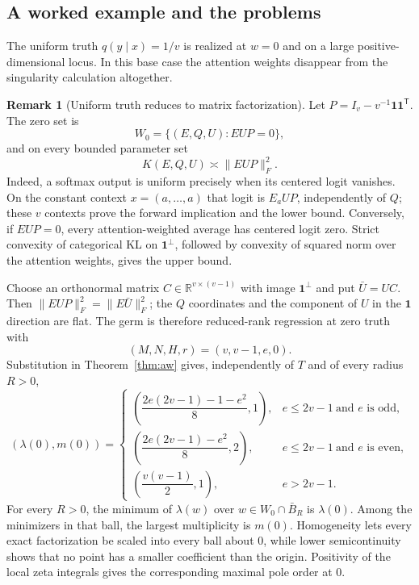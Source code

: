 \documentclass[11pt]{amsart}
\theoremstyle{plain}
\theoremstyle{definition}
\newtheorem{remark}[theorem]{Remark}
\newcommand{\R}{\mathbb{R}}
\begin{document}
\subsection{A worked example and the problems}

The uniform truth $q(y\mid x)=1/v$ is realized at $w=0$ and on a large positive-dimensional locus. In this base case the attention weights disappear from the singularity calculation altogether.

\begin{remark}[Uniform truth reduces to matrix factorization]\label{rem:attn-uniform}
Let $P=I_v-v^{-1}\mathbf1\mathbf1^{\mathsf T}$. The zero set is
\[
 W_0=\{(E,Q,U):EUP=0\},
\]
and on every bounded parameter set
\[
 K(E,Q,U)\asymp \|EUP\|_F^2.
\]
Indeed, a softmax output is uniform precisely when its centered logit vanishes. On the constant context $x=(a,\ldots,a)$ that logit is $E_aUP$, independently of $Q$; these $v$ contexts prove the forward implication and the lower bound. Conversely, if $EUP=0$, every attention-weighted average has centered logit zero. Strict convexity of categorical KL on $\mathbf1^\perp$, followed by convexity of squared norm over the attention weights, gives the upper bound.

Choose an orthonormal matrix $C\in\R^{v\times(v-1)}$ with image $\mathbf1^\perp$ and put $\bar U=UC$. Then $\|EUP\|_F^2=\|E\bar U\|_F^2$; the $Q$ coordinates and the component of $U$ in the $\mathbf1$ direction are flat. The germ is therefore reduced-rank regression at zero truth with
\[
 (M,N,H,r)=(v,v-1,e,0).
\]
Substitution in Theorem~\ref{thm:aw} gives, independently of $T$ and of every radius $R>0$,
\[
 (\lambda(0),m(0))=
 \begin{cases}
 \left(\dfrac{2e(2v-1)-1-e^2}{8},1\right),
    & e\le 2v-1\ \text{and }e\text{ is odd},\\[6pt]
 \left(\dfrac{2e(2v-1)-e^2}{8},2\right),
    & e\le 2v-1\ \text{and }e\text{ is even},\\[6pt]
 \left(\dfrac{v(v-1)}2,1\right),
    & e>2v-1.
 \end{cases}
\]
For every $R>0$, the minimum of $\lambda(w)$ over $w\in W_0\cap\bar B_R$ is $\lambda(0)$. Among the minimizers in that ball, the largest multiplicity is $m(0)$.
Homogeneity lets every exact factorization be scaled into every ball about $0$, while lower semicontinuity shows that no point has a smaller coefficient than the origin. Positivity of the local zeta integrals gives the corresponding maximal pole order at $0$.
\end{remark}
\end{document}
